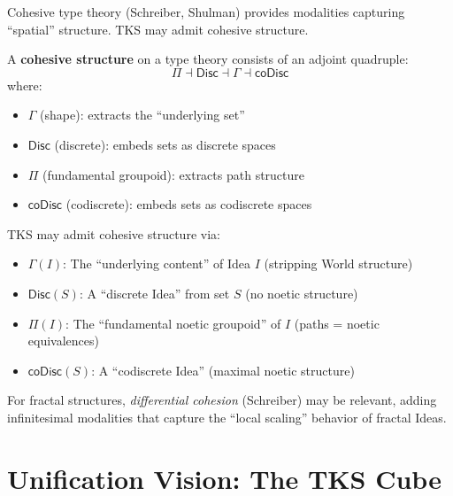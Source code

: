 Cohesive type theory (Schreiber, Shulman) provides modalities capturing
``spatial'' structure. TKS may admit cohesive structure.

\begin{definition}
\label{def:cohesive-modalities}
A \textbf{cohesive structure} on a type theory consists of an adjoint quadruple:
\[
  \Pi \dashv \mathsf{Disc} \dashv \Gamma \dashv \mathsf{coDisc}
\]
where:
\begin{itemize}
  \item $\Gamma$ (shape): extracts the ``underlying set''
  \item $\mathsf{Disc}$ (discrete): embeds sets as discrete spaces
  \item $\Pi$ (fundamental groupoid): extracts path structure
  \item $\mathsf{coDisc}$ (codiscrete): embeds sets as codiscrete spaces
\end{itemize}
\end{definition}

\begin{definition}
\label{def:tks-cohesive}
TKS may admit cohesive structure via:
\begin{itemize}
  \item $\Gamma(I)$: The ``underlying content'' of Idea $I$ (stripping World structure)
  \item $\mathsf{Disc}(S)$: A ``discrete Idea'' from set $S$ (no noetic structure)
  \item $\Pi(I)$: The ``fundamental noetic groupoid'' of $I$ (paths = noetic equivalences)
  \item $\mathsf{coDisc}(S)$: A ``codiscrete Idea'' (maximal noetic structure)
\end{itemize}
\end{definition}

\begin{remark}
\label{rem:differential-cohesion}
For fractal structures, \emph{differential cohesion} (Schreiber) may be relevant,
adding infinitesimal modalities that capture the ``local scaling'' behavior of
fractal Ideas.
\end{remark}

\section{Unification Vision: The TKS Cube}
\label{sec:unification-vision}

